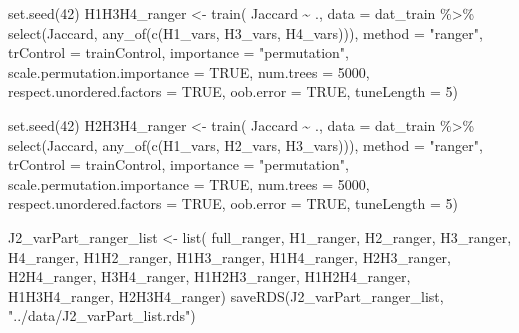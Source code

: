 \documentclass[
  letterpaper,
  DIV=11,
  numbers=noendperiod]{scrreprt}
\newenvironment{Shaded}{\begin{snugshade}}{\end{snugshade}}
\newcommand{\AttributeTok}[1]{\textcolor[rgb]{0.40,0.45,0.13}{#1}}
\newcommand{\ConstantTok}[1]{\textcolor[rgb]{0.56,0.35,0.01}{#1}}
\newcommand{\DecValTok}[1]{\textcolor[rgb]{0.68,0.00,0.00}{#1}}
\newcommand{\FunctionTok}[1]{\textcolor[rgb]{0.28,0.35,0.67}{#1}}
\newcommand{\NormalTok}[1]{\textcolor[rgb]{0.00,0.23,0.31}{#1}}
\newcommand{\OtherTok}[1]{\textcolor[rgb]{0.00,0.23,0.31}{#1}}
\newcommand{\SpecialCharTok}[1]{\textcolor[rgb]{0.37,0.37,0.37}{#1}}
\newcommand{\StringTok}[1]{\textcolor[rgb]{0.13,0.47,0.30}{#1}}
\begin{document}
\begin{Shaded}
\begin{Highlighting}[]
\FunctionTok{set.seed}\NormalTok{(}\DecValTok{42}\NormalTok{)}
\NormalTok{H1H3H4\_ranger }\OtherTok{\textless{}{-}} \FunctionTok{train}\NormalTok{(}
\NormalTok{    Jaccard }\SpecialCharTok{\textasciitilde{}}\NormalTok{ .,}
    \AttributeTok{data =}\NormalTok{ dat\_train }\SpecialCharTok{\%\textgreater{}\%} \FunctionTok{select}\NormalTok{(Jaccard, }\FunctionTok{any\_of}\NormalTok{(}\FunctionTok{c}\NormalTok{(H1\_vars, H3\_vars, H4\_vars))),}
    \AttributeTok{method =} \StringTok{"ranger"}\NormalTok{,}
    \AttributeTok{trControl =}\NormalTok{ trainControl,}
    \AttributeTok{importance =} \StringTok{"permutation"}\NormalTok{,}
    \AttributeTok{scale.permutation.importance =} \ConstantTok{TRUE}\NormalTok{,}
    \AttributeTok{num.trees =} \DecValTok{5000}\NormalTok{,}
    \AttributeTok{respect.unordered.factors =} \ConstantTok{TRUE}\NormalTok{,}
    \AttributeTok{oob.error =} \ConstantTok{TRUE}\NormalTok{,}
    \AttributeTok{tuneLength =} \DecValTok{5}\NormalTok{)}

\FunctionTok{set.seed}\NormalTok{(}\DecValTok{42}\NormalTok{)}
\NormalTok{H2H3H4\_ranger }\OtherTok{\textless{}{-}} \FunctionTok{train}\NormalTok{(}
\NormalTok{    Jaccard }\SpecialCharTok{\textasciitilde{}}\NormalTok{ .,}
    \AttributeTok{data =}\NormalTok{ dat\_train }\SpecialCharTok{\%\textgreater{}\%} \FunctionTok{select}\NormalTok{(Jaccard, }\FunctionTok{any\_of}\NormalTok{(}\FunctionTok{c}\NormalTok{(H1\_vars, H2\_vars, H3\_vars))),}
    \AttributeTok{method =} \StringTok{"ranger"}\NormalTok{,}
    \AttributeTok{trControl =}\NormalTok{ trainControl,}
    \AttributeTok{importance =} \StringTok{"permutation"}\NormalTok{,}
    \AttributeTok{scale.permutation.importance =} \ConstantTok{TRUE}\NormalTok{,}
    \AttributeTok{num.trees =} \DecValTok{5000}\NormalTok{,}
    \AttributeTok{respect.unordered.factors =} \ConstantTok{TRUE}\NormalTok{,}
    \AttributeTok{oob.error =} \ConstantTok{TRUE}\NormalTok{,}
    \AttributeTok{tuneLength =} \DecValTok{5}\NormalTok{)}

\NormalTok{J2\_varPart\_ranger\_list }\OtherTok{\textless{}{-}} \FunctionTok{list}\NormalTok{(}
\NormalTok{    full\_ranger, H1\_ranger, H2\_ranger, H3\_ranger, H4\_ranger, }
\NormalTok{    H1H2\_ranger, H1H3\_ranger, H1H4\_ranger, }
\NormalTok{    H2H3\_ranger, H2H4\_ranger, }
\NormalTok{    H3H4\_ranger, }
\NormalTok{    H1H2H3\_ranger, H1H2H4\_ranger, H1H3H4\_ranger, }
\NormalTok{    H2H3H4\_ranger)}
\FunctionTok{saveRDS}\NormalTok{(J2\_varPart\_ranger\_list, }\StringTok{"../data/J2\_varPart\_list.rds"}\NormalTok{)}
\end{Highlighting}
\end{Shaded}
\end{document}
